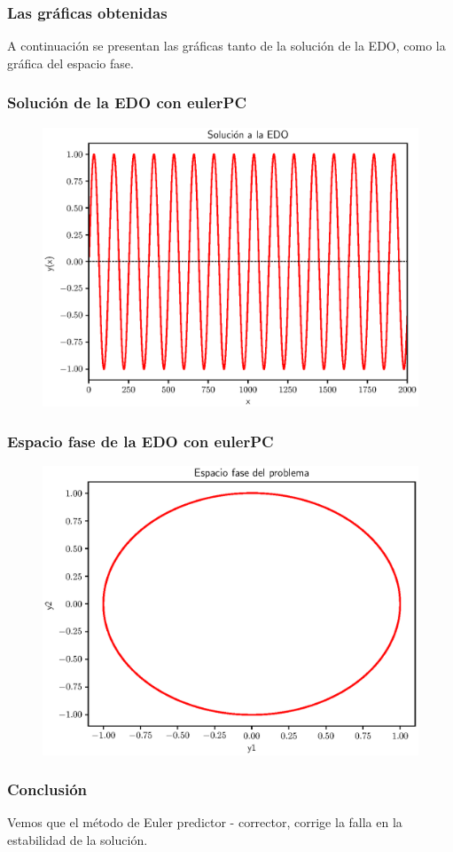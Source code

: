 \documentclass[12pt]{beamer}
\begin{document}
\begin{frame}
\frametitle{Las gráficas obtenidas}
A continuación se presentan las gráficas tanto de la solución de la EDO, como la gráfica del espacio fase.
\end{frame}
\begin{frame}
\frametitle{Solución de la EDO con eulerPC}
\begin{figure}
	\centering
	\includegraphics[scale=0.55]{Imagenes/plot_eulerPC_ejercicio_01.eps}
\end{figure}
\end{frame}
\begin{frame}
\frametitle{Espacio fase de la EDO con eulerPC}
\begin{figure}
	\centering
	\includegraphics[scale=0.55]{Imagenes/plot_eulerPC_ejercicio_02.eps}
\end{figure}
\end{frame}
\begin{frame}
\frametitle{Conclusión}
Vemos que el método de Euler predictor - corrector, corrige la falla en la estabilidad de la solución.
\end{frame}
\end{document}
